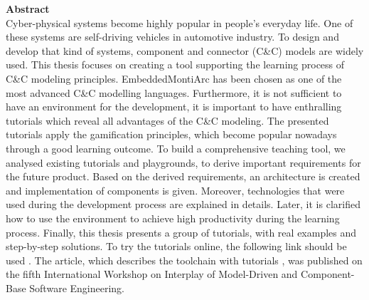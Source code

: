 \vspace*{2cm}

\vspace{10ex}
{\bf\Large Abstract} \\ [1em]
Cyber-physical systems become highly popular in people's everyday life. One of these systems are self-driving vehicles in automotive industry. To design and develop that kind of systems, component and connector (C\&C) models are widely used. This thesis focuses on creating a tool supporting the learning process of C\&C modeling principles. EmbeddedMontiArc has been chosen as one of the most advanced C\&C modelling languages. Furthermore, it is not sufficient to have an environment for the development, it is important to have enthralling tutorials which reveal all advantages of the C\&C modeling. The presented tutorials apply the gamification principles, which become popular nowadays through a good learning outcome. To build a comprehensive teaching tool, we analysed existing tutorials and playgrounds, to derive important requirements for the future product. Based on the derived requirements, an architecture is created and implementation of components is given. Moreover, technologies that were used during the development process are explained in details. Later, it is clarified how to use the environment to achieve high productivity during the learning process. Finally, this thesis presents a group of tutorials, with real examples and step-by-step solutions. To try the tutorials online, the following link should be used \cite{OnlineExample}. The article, which describes the toolchain with tutorials \cite{TeachPlay}, was published on the fifth International Workshop on Interplay of Model-Driven and Component-Base Software Engineering.